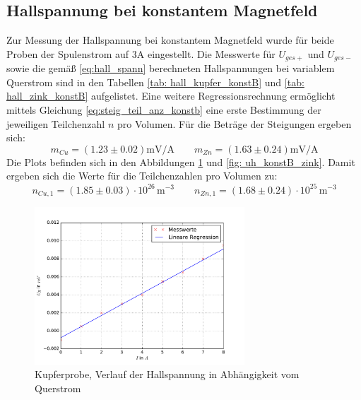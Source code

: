 \subsection{Hallspannung bei konstantem Magnetfeld}
Zur Messung der Hallspannung bei konstantem Magnetfeld wurde für beide Proben der Spulenstrom auf $3\si{\ampere}$ eingestellt. Die %
Messwerte für $U_{ges+}$ und $U_{ges-}$ sowie die gemäß \eqref{eq:hall_spann} berechneten Hallspannungen bei variablem Querstrom sind in den %
Tabellen \ref{tab: hall_kupfer_konstB} und \ref{tab: hall_zink_konstB} aufgelistet. Eine weitere Regressionsrechnung ermöglicht mittels Gleichung \eqref{eq:steig_teil_anz_konstb} eine
erste Bestimmung der jeweiligen Teilchenzahl $n$ pro Volumen. Für die Beträge der Steigungen ergeben sich: %
\begin{equation}
  m_{Cu} = (1.23 \pm 0.02)\si{\milli \volt \per \ampere}  \quad \quad m_{Zn} = (1.63 \pm 0.24)\si{\milli \volt \per \ampere}%
\end{equation}
Die Plots befinden sich in den Abbildungen \ref{fig: uh_konstB_kupfer} und \ref{fig: uh_konstB_zink}.
Damit ergeben sich die Werte für die Teilchenzahlen pro Volumen zu:
\begin{equation}
  n_{Cu,1} = (1.85 \pm 0.03)\cdot 10^{26}\,\si{ \meter^{-3}} \quad \quad n_{Zn,1} = (1.68\pm 0.24)\cdot 10^{25}\,\si{ \meter^{-3}}%
\end{equation}
\begin{figure}
  \centering
  \includegraphics[width=0.7\textwidth]{pics/u_h_kupfer_konstB.pdf}
  \caption{Kupferprobe, Verlauf der Hallspannung in Abhängigkeit vom Querstrom}
  \label{fig: uh_konstB_kupfer}
\end{figure}
